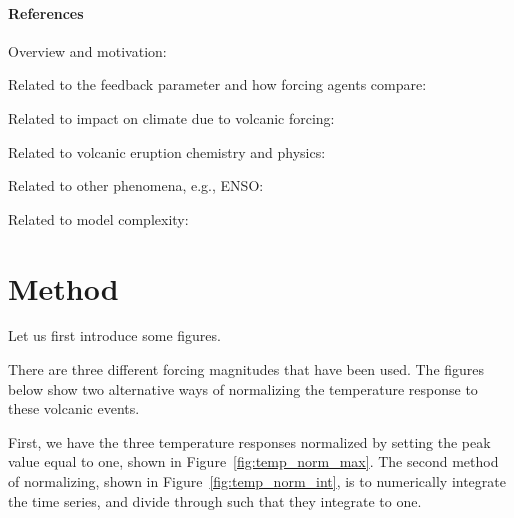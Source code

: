\documentclass{ametsocV5}
\begin{document}
\paragraph*{References}

Overview and motivation: \citet{marshall2022}

Related to the feedback parameter and how forcing agents compare: \citet{gunther2022,
  hansen2005, salvi2022, pauling2021, richardson2019, knutti2017, marvel2016, ollila2016,
  merlis2014, boer2007, wigley2005, gregory2020}

Related to impact on climate due to volcanic forcing: \citet{yang2019, timmreck2010,
  timmreck2009, jones2005, ottobliesner2016, santer2016, yokohata2005, zanchettin2019,
  toohey2016b}

Related to volcanic eruption chemistry and physics: \citet{sukhodolov2018,
  arfeuille2014, douglass2006, soden2002, lin2022, marshall2021, marshall2020}

Related to other phenomena, e.g., ENSO: \citet{lehner2016, chen2022, marshall2018}

Related to model complexity: \citet{rypdal2012}


\section{Method}

Let us first introduce some figures.

There are three different forcing magnitudes that have been used. The figures below
show two alternative ways of normalizing the temperature response to these volcanic
events.

First, we have the three temperature responses normalized by setting the peak value
equal to one, shown in Figure~\ref{fig:temp_norm_max}. The second method of
normalizing, shown in Figure~\ref{fig:temp_norm_int}, is to numerically integrate the
time series, and divide through such that they integrate to one.
\end{document}
